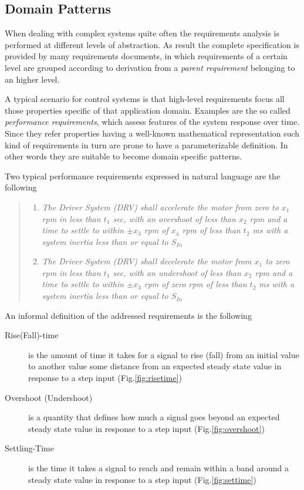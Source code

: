 \subsection{Domain Patterns}
\label{ssec:dompatterns}

When dealing with complex systems quite often the requirements analysis is performed at different levels of abstraction. As result the complete specification is provided by many requirements documents, in which requirements of a certain level are grouped according to derivation from a \textit{parent requirement} belonging to an higher level. 
\par A typical scenario for control systems is that high-level requirements focus all those properties specific of that application domain. Examples are the so called \textit{performance requirements}, which assess features of the system response over time. Since they refer properties having a well-known mathematical representation such kind of requirements in turn are prone to have a parameterizable definition. In other words they are suitable to become domain specific patterns.
\par Two typical performance requirements expressed in natural language are the following
\begin{quote}
\begin{enumerate}
\label{en:ptreq}
\item \textit{The Driver System (DRV) shall accelerate the motor from zero to $x_1$ rpm in less than $t_1$ sec, with an overshoot of less than $x_2$ rpm  and a time to settle to within $\pm x_3$ rpm of $x_4$ rpm of less than $t_2$ ms with a system inertia less than or equal to $S_{In}$}
\item \textit{The Driver System (DRV) shall decelerate the motor from $x_1$ to zero rpm in less than $t_1$ sec, with an undershoot of less than $x_2$ rpm and a time to settle to within $\pm x_3$ rpm of  zero rpm of less than $t_2$ ms with a system inertia less than or equal to $S_{In}$}
\end{enumerate}
\end{quote} 
An informal definition of the addressed requirements is the following
\begin{description}
\item[Rise(Fall)-time] is the amount of time it takes for a signal to rise (fall) from an initial value to another value some distance from an expected steady state value in response to a step input  (Fig.\ref{fig:risetime})
\item[Overshoot (Undershoot)] is a quantity that defines how much a signal goes beyond an expected steady state value in response to a step input (Fig.\ref{fig:overshoot})
\item[Settling-Time] is the time it takes a signal to reach and remain within a band around a steady state value in response to a step input (Fig.\ref{fig:settime})
\end{description}
